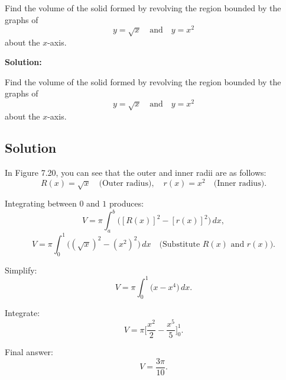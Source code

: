 \documentclass[12pt]{article}
\theoremstyle{beautifulthm}
\begin{document}
\begin{tcolorbox}[colback=examplebg, colframe=red!75!black, title=\textbf{EXAMPLE 1: Volume with Washer Method}, fonttitle=\bfseries, sharp corners]

Find the volume of the solid formed by revolving the region bounded by the graphs of 
\[
y = \sqrt{x} \quad \text{and} \quad y = x^2
\]
about the $x$-axis.



\tcblower
\textbf{Solution:} 

Find the volume of the solid formed by revolving the region bounded by the graphs of 
\[
y = \sqrt{x} \quad \text{and} \quad y = x^2
\]
about the $x$-axis.

\subsection*{Solution}
In Figure 7.20, you can see that the outer and inner radii are as follows:
\[
R(x) = \sqrt{x} \quad \text{(Outer radius)}, \quad r(x) = x^2 \quad \text{(Inner radius)}.
\]

Integrating between $0$ and $1$ produces:
\[
V = \pi \int_{a}^{b} \Big( [R(x)]^2 - [r(x)]^2 \Big) \, dx,
\]
\[
V = \pi \int_{0}^{1} \Big( (\sqrt{x})^2 - (x^2)^2 \Big) \, dx \quad \text{(Substitute $R(x)$ and $r(x)$)}.
\]

Simplify:
\[
V = \pi \int_{0}^{1} \Big( x - x^4 \Big) \, dx.
\]

Integrate:
\[
V = \pi \Bigg[ \frac{x^2}{2} - \frac{x^5}{5} \Bigg]_{0}^{1}.
\]


Final answer:
\[
V = \frac{3\pi}{10}.
\]


\end{tcolorbox}
\end{document}

